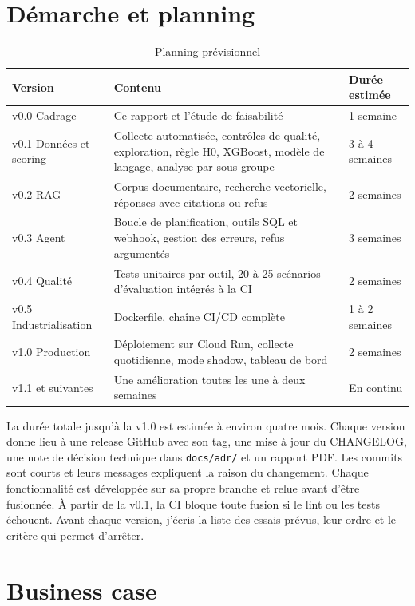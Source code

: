 \documentclass[11pt,a4paper]{article}
\begin{document}
\section{Démarche et planning}

\begin{table}[H]
\centering\small
\begin{tabularx}{\linewidth}{@{}l Y l@{}}
\toprule
Version & Contenu & Durée estimée \\
\midrule
v0.0 Cadrage & Ce rapport et l'étude de faisabilité & 1 semaine \\
v0.1 Données et scoring & Collecte automatisée, contrôles de qualité, exploration, règle H0, XGBoost, modèle de langage, analyse par sous-groupe & 3 à 4 semaines \\
v0.2 RAG & Corpus documentaire, recherche vectorielle, réponses avec citations ou refus & 2 semaines \\
v0.3 Agent & Boucle de planification, outils SQL et webhook, gestion des erreurs, refus argumentés & 3 semaines \\
v0.4 Qualité & Tests unitaires par outil, 20 à 25 scénarios d'évaluation intégrés à la CI & 2 semaines \\
v0.5 Industrialisation & Dockerfile, chaîne CI/CD complète & 1 à 2 semaines \\
v1.0 Production & Déploiement sur Cloud Run, collecte quotidienne, mode shadow, tableau de bord & 2 semaines \\
v1.1 et suivantes & Une amélioration toutes les une à deux semaines & En continu \\
\bottomrule
\end{tabularx}
\caption{Planning prévisionnel}
\end{table}

La durée totale jusqu'à la v1.0 est estimée à environ quatre mois. Chaque version donne lieu à une release GitHub avec son tag, une mise à jour du CHANGELOG, une note de décision technique dans \texttt{docs/adr/} et un rapport PDF. Les commits sont courts et leurs messages expliquent la raison du changement. Chaque fonctionnalité est développée sur sa propre branche et relue avant d'être fusionnée. À partir de la v0.1, la CI bloque toute fusion si le lint ou les tests échouent. Avant chaque version, j'écris la liste des essais prévus, leur ordre et le critère qui permet d'arrêter.

\section{Business case}
\end{document}
